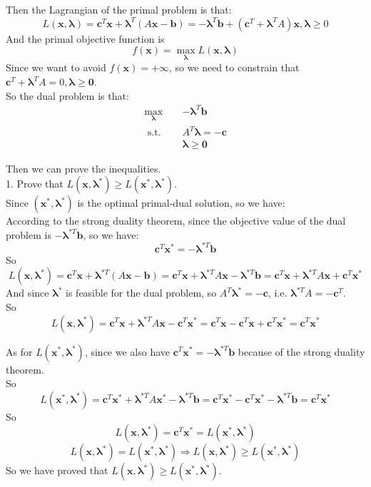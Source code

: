 \documentclass[10pt]{article}
\begin{document}
Then the Lagrangian of the primal problem is that:
$$L(\bm{x},\bm{\lambda}) = \bm{c}^T\bm{x} + \bm{\lambda}^T(A\bm{x} - \bm{b})=-\bm{\lambda}^T\bm{b}+(\bm{c}^T+\bm{\lambda}^TA)\bm{x},\bm{\lambda}\geq 0$$
And the primal objective function is
$$f(\bm{x}) = \max\limits_{\bm{\lambda}} L(\bm{x},\bm{\lambda})$$
Since we want to avoid $f(\bm{x})=+\infty$, so we need to constrain that $\bm{c}^T+\bm{\lambda}^TA=0,\bm{\lambda}\geq\bm{0}$.\\
So the dual problem is that:
\begin{equation}
\begin{aligned}
\max_{\bm{\lambda}} \quad & -\bm{\lambda}^T\bm{b} \\
\text { s.t. } \quad & A^T\bm{\lambda} = -\bm{c} \\
& \bm{\lambda} \geq \bm{0}
\end{aligned}
\end{equation}

Then we can prove the inequalities.\\
1. Prove that $L(\bm{x}, \bm{\lambda}^*) \geq L(\bm{x}^*, \bm{\lambda}^*)$.\\
Since $(\bm{x}^*, \bm{\lambda}^*)$ is the optimal primal-dual solution, so we have:\\
According to the strong duality theorem, since the objective value of the dual problem is $-\bm{\lambda}^{*T}\bm{b}$, so we have:
$$\bm{c}^T\bm{x}^* = -\bm{\lambda}^{*T}\bm{b}$$
So
$$L(\bm{x}, \bm{\lambda}^*)=\bm{c}^T\bm{x} + \bm{\lambda}^{*T}(A\bm{x} - \bm{b})=\bm{c}^T\bm{x} + \bm{\lambda}^{*T}A\bm{x} - \bm{\lambda}^{*T}\bm{b}=\bm{c}^T\bm{x} + \bm{\lambda}^{*T}A\bm{x} + \bm{c}^{T}\bm{x}^*$$
And since $\bm{\lambda}^*$ is feasible for the dual problem, so $A^T\bm{\lambda}^* = -\bm{c}$, i.e. $\bm{\lambda}^{*T}A = -\bm{c}^T$.\\
So
$$L(\bm{x},\bm{\lambda}^*)=\bm{c}^T\bm{x} + \bm{\lambda}^{*T}A\bm{x} - \bm{c}^{T}\bm{x}^*=\bm{c}^T\bm{x} - \bm{c}^T\bm{x} + \bm{c}^T\bm{x}^* =\bm{c}^T\bm{x}^* $$

As for $L(\bm{x}^*,\bm{\lambda}^*)$, since we also have $\bm{c}^T\bm{x}^* = -\bm{\lambda}^{*T}\bm{b}$ because of the strong duality theorem.\\
So
$$L(\bm{x}^*, \bm{\lambda}^*)=\bm{c}^T\bm{x}^* + \bm{\lambda}^{*T}A\bm{x}^* - \bm{\lambda}^{*T}\bm{b}=\bm{c}^T\bm{x}^* - \bm{c}^T\bm{x}^* - \bm{\lambda}^{*T}\bm{b}=\bm{c}^T\bm{x}^*$$
So
$$L(\bm{x},\bm{\lambda}^*)= \bm{c}^T\bm{x}^*=L(\bm{x}^*, \bm{\lambda}^*)$$
$$L(\bm{x},\bm{\lambda}^*)=L(\bm{x}^*, \bm{\lambda}^*)\Rightarrow L(\bm{x},\bm{\lambda}^*)\geq L(\bm{x}^*, \bm{\lambda}^*)$$
So we have proved that $L(\bm{x}, \bm{\lambda}^*) \geq L(\bm{x}^*, \bm{\lambda}^*)$.\\
\end{document}

